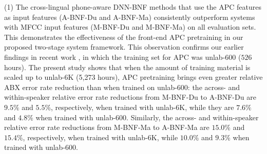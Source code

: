 \documentclass[transmag]{IEEEtran}
\begin{document}

(1) The cross-lingual phone-aware DNN-BNF methods that use the APC features as input features (A-BNF-Du and A-BNF-Ma) consistently outperform  systems with MFCC input features (M-BNF-Du and M-BNF-Ma) on all evaluation sets. This demonstrates the effectiveness of the front-end APC pretraining in our proposed two-stage system framework. This observation confirms our earlier findings in recent work  \cite{feng2020unsupervised}, in which the training set for APC was unlab-600 ($526$ hours).
The present study shows that when the amount of training material is scaled up to unlab-6K (5,273 hours), APC pretraining brings even greater relative ABX error rate reduction than when trained on unlab-600: the across- and within-speaker relative error rate reductions from M-BNF-Du to A-BNF-Du are $9.5\%$ and $5.5\%$, respectively, when trained with unlab-6K, while they are $7.6\%$ and $4.8\%$ when  trained with unlab-600. Similarly, the across- and within-speaker relative error rate reductions from M-BNF-Ma to A-BNF-Ma are
$15.0\%$ and $15.4\%$, respectively, when trained with unlab-6K, while $10.0\%$ and $9.3\%$ when trained with   unlab-600.

\end{document}
